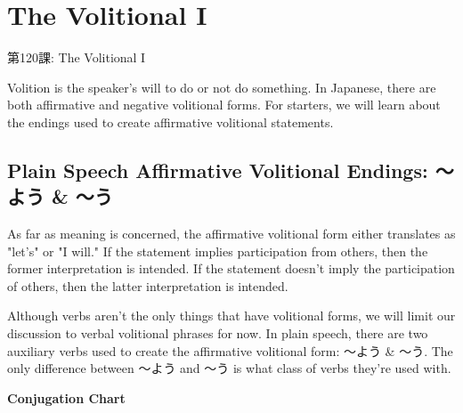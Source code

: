     
\chapter{The Volitional I}

\begin{center}
\begin{Large}
第120課: The Volitional I 
\end{Large}
\end{center}
 
\par{ Volition is the speaker's will to do or not do something. In Japanese, there are both affirmative and negative volitional forms. For starters, we will learn about the endings used to create affirmative volitional statements. }
      
\section{Plain Speech Affirmative Volitional Endings: ～よう \& ～う}
 
\par{ As far as meaning is concerned, the affirmative volitional form either translates as "let's" or "I will." If the statement implies participation from others, then the former interpretation is intended. If the statement doesn't imply the participation of others, then the latter interpretation is intended. }

\par{ Although verbs aren't the only things that have volitional forms, we will limit our discussion to verbal volitional phrases for now. In plain speech, there are two auxiliary verbs used to create the affirmative volitional form: ～よう \& ～う. The only difference between ～よう and ～う is what class of verbs they're used with. }

\begin{center}
\textbf{Conjugation Chart } 
\end{center}


